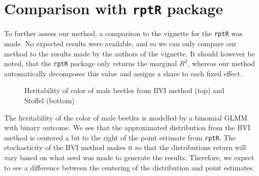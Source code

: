 \section{Comparison with \texttt{rptR} package}


To further assess our method, a comparison to the vignette for the \texttt{rptR} was made. No expected results were available, and so we can only compare our method to the results made by the authors of the vignette. It should however be noted, that the \texttt{rptR} package only returns the marginal $R^2$, whereas our method automatically decomposes this value and assigns a share to each fixed effect. 


\begin{figure}[!ht]
  \centering
  \caption{Heritability of color of male beetles from BVI method (top) and Stoffel (bottom)}
\end{figure}

The heritability of the color of male beetles is modelled by a binomial GLMM with binary outcome. We see that the approximated distribution from the BVI method is centered a bit to the right of the point estimate from \texttt{rptR}. The stochasticity of the BVI method makes it so that the distributions return will vary based on what seed was made to generate the results. Therefore, we expect to see a difference between the centering of the distribution and point estimates. 

